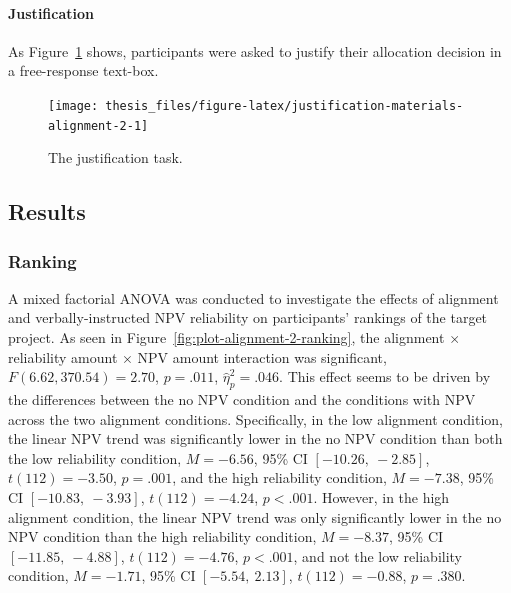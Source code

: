 \documentclass[a4paper, nobind, dvipsnames]{templates/ociamthesis}
\theoremstyle{definition}
\theoremstyle{definition}
\theoremstyle{definition}
\theoremstyle{definition}
\theoremstyle{remark}
\begin{document}
\hypertarget{justification-materials-alignment-2}{%
\paragraph{Justification}\label{justification-materials-alignment-2}}

As Figure~\ref{fig:justification-materials-alignment-2} shows, participants
were asked to justify their allocation decision in a free-response text-box.



\begin{figure}
\texttt{[image: thesis\_files/figure-latex/justification-materials-alignment-2-1]} \caption{The justification task.}\label{fig:justification-materials-alignment-2}
\end{figure}

\hypertarget{results-alignment-2-appendix}{%
\subsection{Results}\label{results-alignment-2-appendix}}

\subsubsection{Ranking}

A mixed factorial ANOVA was conducted to investigate the effects of alignment
and verbally-instructed NPV reliability on participants' rankings of the
target project. As seen in Figure~\ref{fig:plot-alignment-2-ranking}, the
alignment \(\times\) reliability amount \(\times\) NPV amount interaction was
significant,
\(F(6.62, 370.54) = 2.70\), \(p = .011\), \(\hat{\eta}^2_p = .046\). This
effect seems to be driven by the differences between the no NPV condition and
the conditions with NPV across the two alignment conditions. Specifically, in
the low alignment condition, the linear NPV trend was significantly lower in the
no NPV condition than both the low reliability condition,
\(M = -6.56\), 95\% CI \([-10.26,~-2.85]\), \(t(112) = -3.50\), \(p = .001\), and the high
reliability condition, \(M = -7.38\), 95\% CI \([-10.83,~-3.93]\), \(t(112) = -4.24\), \(p < .001\).
However, in the high alignment condition, the linear NPV trend was only
significantly lower in the no NPV condition than the high reliability condition,
\(M = -8.37\), 95\% CI \([-11.85,~-4.88]\), \(t(112) = -4.76\), \(p < .001\), and not the low
reliability condition, \(M = -1.71\), 95\% CI \([-5.54,~2.13]\), \(t(112) = -0.88\), \(p = .380\).
\end{document}
